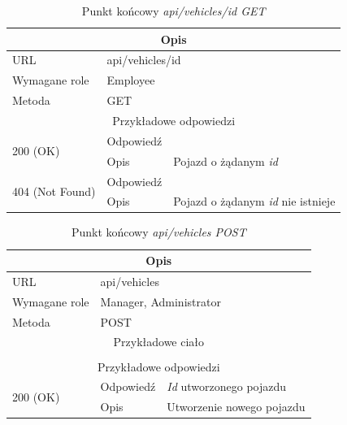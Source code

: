 \documentclass[eng,printmode,openany]{mgr}
\begin{document}
	\begin{table}[H]
		\caption{Punkt końcowy \textit{api/vehicles/id GET}}
		\begin{tabularx}{\textwidth}{|l|l|X|}
			\hline
			\multicolumn{3}{|c|}{Opis}                         						\\ \hline
			URL                       & \multicolumn{2}{l|}{api/vehicles/id} 		\\ \hline
			Wymagane role             & \multicolumn{2}{l|}{Employee} 				\\ \hline
			Metoda                    & \multicolumn{2}{l|}{GET} 					\\ \hline
			\multicolumn{3}{|c|}{ Przykładowe odpowiedzi}                   		\\ \hline
			\multirow{2}{*}{200 (OK)} 			& Odpowiedź    	&        \\ \cline{2-3} 
			& Opis         	& Pojazd o żądanym \textit{id}      									\\ \hline
			\multirow{2}{*}{404 (Not Found)} 	& Odpowiedź     &    \\ \cline{2-3} 
			& Opis          & Pojazd o żądanym \textit{id} nie istnieje      						\\ \hline
		\end{tabularx}
	\end{table}
	
	\begin{table}[H]
		\caption{Punkt końcowy \textit{api/vehicles POST}}
		\begin{tabularx}{\textwidth}{|l|l|X|}
			\hline
			\multicolumn{3}{|c|}{Opis}                         						\\ \hline
			URL                       & \multicolumn{2}{l|}{api/vehicles} 			\\ \hline
			Wymagane role             & \multicolumn{2}{l|}{Manager, Administrator} \\ \hline
			Metoda                    & \multicolumn{2}{l|}{POST} 					\\ \hline
			\multicolumn{3}{|c|}{Przykładowe ciało}         						\\ \hline
			\multicolumn{3}{|c|}{} 		\\ \hline
			\multicolumn{3}{|c|}{ Przykładowe odpowiedzi}                   						\\ \hline
			\multirow{2}{*}{200 (OK)} 			& Odpowiedź     &  \textit{Id} utworzonego pojazdu  \\ \cline{2-3} 
			& Opis         	& Utworzenie nowego pojazdu   		\\ \hline
		\end{tabularx}
	\end{table}
	
\end{document}
